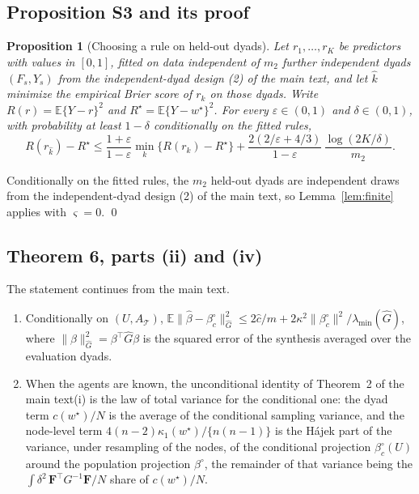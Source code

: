 \documentclass[12pt]{article}
\newcommand{\E}{\mathbb{E}}
\newcommand{\calT}{\mathcal{T}}
\newcommand{\norm}[1]{\|#1\|}
\newcommand{\wstar}{w^{\star}}
\newcommand{\bproj}{\beta^{\circ}}
\newcommand{\bhat}{\hat\beta}
\newcommand{\Fv}{\mathbf{F}}
\newtheorem{propositionS}{Proposition}
\begin{document}
\subsection*{Proposition S3 and its proof}
\begin{propositionS}[Choosing a rule on held-out dyads]
\label{prop:selectS}
Let $r_1,\dots,r_K$ be predictors with values in $[0,1]$, fitted on data independent of $m_2$ further independent dyads $(F_s,Y_s)$ from the independent-dyad design (2) of the main text, and let $\hat k$ minimize the empirical Brier score of $r_k$ on those dyads. Write $R(r)=\E\{Y-r\}^2$ and $R^\star=\E\{Y-\wstar\}^2$. For every $\varepsilon\in(0,1)$ and $\delta\in(0,1)$, with probability at least $1-\delta$ conditionally on the fitted rules,
\[
R(r_{\hat k})-R^\star\le\frac{1+\varepsilon}{1-\varepsilon}\min_k\{R(r_k)-R^\star\}+\frac{2(2/\varepsilon+4/3)}{1-\varepsilon}\,\frac{\log(2K/\delta)}{m_2}.
\]
\end{propositionS}

Conditionally on the fitted rules, the $m_2$ held-out dyads are independent draws from the independent-dyad design (2) of the main text, so Lemma~\ref{lem:finite} applies with $\varsigma=0$. \qed

\subsection*{Theorem 6, parts (ii) and (iv)}
The statement continues from the main text.
\begin{enumerate}
\item[(ii)] Conditionally on $(U,A_{\calT})$, $\E\norm{\bhat-\beta^{\circ}_{c}}^2_{\hat G}\le2\hat c/m+2\kappa^2\norm{\beta^{\circ}_{c}}^2/\lambda_{\min}(\hat G)$, where $\norm{\beta}^2_{\hat G}=\beta^{\top}\hat G\beta$ is the squared error of the synthesis averaged over the evaluation dyads.
\item[(iv)] When the agents are known, the unconditional identity of Theorem~2 of the main text(i) is the law of total variance for the conditional one: the dyad term $c(\wstar)/N$ is the average of the conditional sampling variance, and the node-level term $4(n-2)\kappa_1(\wstar)/\{n(n-1)\}$ is the H\'ajek part of the variance, under resampling of the nodes, of the conditional projection $\beta^{\circ}_{c}(U)$ around the population projection $\bproj$, the remainder of that variance being the $\int\delta^2\,\Fv^{\top}G^{-1}\Fv/N$ share of $c(\wstar)/N$.
\end{enumerate}
\end{document}

